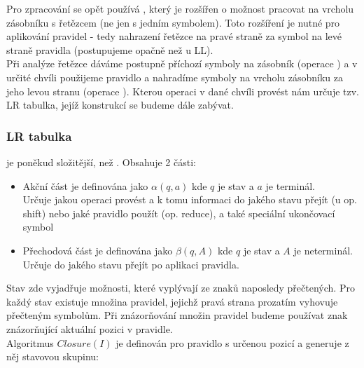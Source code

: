 Pro zpracování se opět používá , který je
rozšířen o možnost pracovat na vrcholu zásobníku s řetězcem (ne jen s jedním symbolem).
Toto rozšíření je nutné pro aplikování pravidel - tedy nahrazení řetězce na pravé straně za
symbol na levé straně pravidla (postupujeme opačně než u LL).\\

Při analýze řetězce dáváme postupně příchozí symboly na zásobník (operace )
a v určité chvíli použijeme pravidlo a nahradíme symboly na vrcholu zásobníku za
jeho levou stranu (operace ). Kterou operaci v dané chvíli provést
nám určuje tzv. LR tabulka, jejíž konstrukcí se budeme dále zabývat.\\

\subsubsection*{LR tabulka}

 je poněkud složitější, než . Obsahuje 2 části:

\begin{itemize}
  \item Akční část je definována jako $\alpha(q, a)$ kde $q$ je stav a $a$ je terminál.\\
  Určuje jakou operaci provést a k tomu informaci
  do jakého stavu přejít (u op. shift) nebo jaké pravidlo použít (op. reduce), a také speciální
  ukončovací symbol
  \item Přechodová část je definována jako $\beta(q, A)$ kde $q$ je stav a $A$ je neterminál.\\
  Určuje do jakého stavu přejít po aplikaci pravidla.
\end{itemize}

Stav zde vyjadřuje možnosti, které vyplývají ze znaků naposledy přečtených.
Pro každý stav existuje množina pravidel, jejichž pravá strana prozatím vyhovuje přečteným symbolům.
Při znázorňování množin pravidel budeme používat znak  znázorňující aktuální pozici v pravidle.\\

\noindent
Algoritmus $Closure(I)$ je definován pro pravidlo s určenou pozicí a generuje z něj stavovou skupinu:\\
\begin{algorithm}[H]
  \caption{$Closure(I)$}

  \BlankLine
\end{algorithm}
\vspace{0.5cm}

